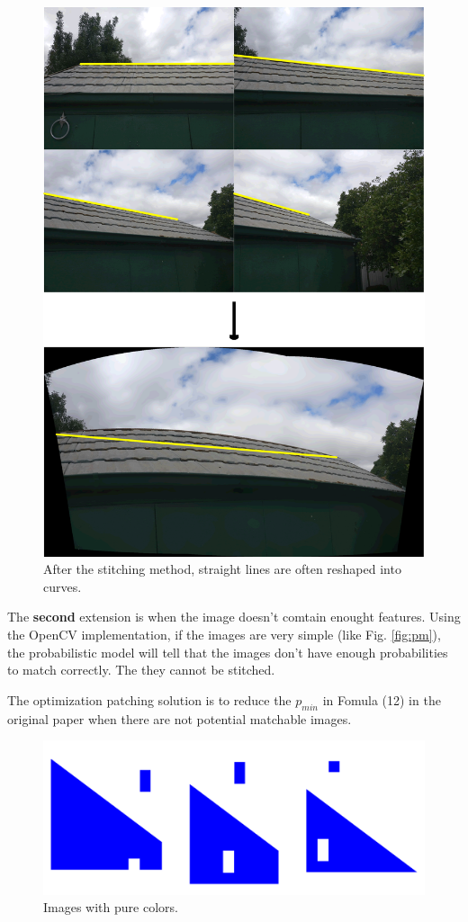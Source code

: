 \documentclass[10pt,twocolumn,letterpaper]{article}
\begin{document}
\begin{figure}[t]
    \begin{center}
        \includegraphics[width=0.9\linewidth]{line_combine}
    \end{center}
    \caption{After the stitching method, straight lines are often reshaped into curves.}
    \label{fig:cml}
\end{figure}

The \textbf{second} extension is when the image doesn't comtain enought features.
Using the OpenCV implementation, if the images are very simple (like Fig. \ref{fig:pm}),
the probabilistic model will tell that the images don't have enough probabilities to match correctly.
The they cannot be stitched.

The optimization patching solution is to reduce the $p_{min}$ in Fomula (12) in the original paper when there are not potential matchable images.

\begin{figure}[t]
    \begin{center}
        \includegraphics[width=0.9\linewidth]{pure_color}
    \end{center}
    \caption{Images with pure colors.}
    \label{fig:pc}
\end{figure}
\end{document}
